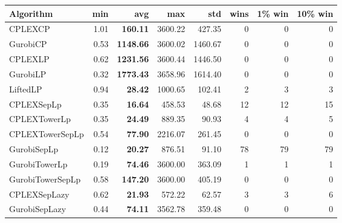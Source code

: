 \begin{tabular}{lrrrrrrr}
Algorithm & min & avg & max & std
& wins & 1\% win & 10\% win 
\\
\hline
CPLEXCP&1.01& \bf160.11& 3600.22& 427.35&0&0&0\\
GurobiCP&0.53& \bf1148.66& 3600.02& 1460.67&0&0&0\\
CPLEXLP&0.62& \bf1231.56& 3600.44& 1446.50&0&0&0\\
GurobiLP&0.32& \bf1773.43& 3658.96& 1614.40&0&0&0\\
LiftedLP&0.94& \bf28.42& 1000.65& 102.41&2&3&3\\
CPLEXSepLp&0.35& \bf16.64& 458.53& 48.68&12&12&15\\
CPLEXTowerLp&0.35& \bf24.49& 889.35& 90.93&4&4&5\\
CPLEXTowerSepLp&0.54& \bf77.90& 2216.07& 261.45&0&0&0\\
GurobiSepLp&0.12& \bf20.27& 876.51& 91.10&78&79&79\\
GurobiTowerLp&0.19& \bf74.46& 3600.00& 363.09&1&1&1\\
GurobiTowerSepLp&0.58& \bf147.20& 3600.00& 405.19&0&0&0\\
CPLEXSepLazy&0.62& \bf21.93& 572.22& 62.57&3&3&6\\
GurobiSepLazy&0.44& \bf74.11& 3562.78& 359.48&0&0&0
\end{tabular}
